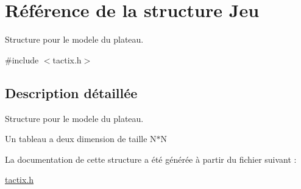 \hypertarget{struct_jeu}{\section{Référence de la structure Jeu}
\label{struct_jeu}
}


Structure pour le modele du plateau.  




{\ttfamily \#include $<$tactix.\-h$>$}



\subsection{Description détaillée}
Structure pour le modele du plateau. 

Un tableau a deux dimension de taille N$\ast$\-N 

La documentation de cette structure a été générée à partir du fichier suivant \-:\begin{DoxyCompactItemize}
\item 
\hyperlink{tactix_8h}{tactix.\-h}\end{DoxyCompactItemize}
